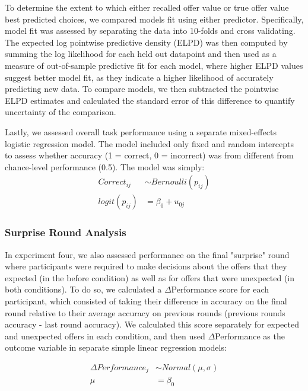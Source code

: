 \documentclass[10pt,letterpaper]{article}
\begin{document}
To determine the extent to which either recalled offer value or true offer value best predicted choices, we compared models fit using either predictor. Specifically, model fit was assessed by separating the data into 10-folds and cross validating. The expected log pointwise predictive density (ELPD) was then computed by summing the log likelihood for each held out datapoint and then used as a measure of out-of-sample predictive fit for each model, where higher ELPD values suggest better model fit, as they indicate a higher likelihood of accurately predicting new data. To compare models, we then subtracted the pointwise ELPD estimates and calculated the standard error of this difference to quantify uncertainty of the comparison\cite{vehtariPracticalBayesianModel2017, sivulaUncertaintyBayesianLeaveOneOut2023}.

Lastly, we assessed overall task performance using a separate mixed-effects logistic regression model. The model included only fixed and random intercepts to assess whether accuracy (1 = correct, 0 = incorrect) was from different from chance-level performance (0.5). The model was simply:
\begin{align*}
Correct_{ij} &\sim Bernoulli(p_{ij}) \\
logit(p_{ij}) &= \beta_0 + u_{0j}
\end{align*}

\subsubsection{Surprise Round Analysis}

In experiment four, we also assessed performance on the final "surprise" round where participants were required to make decisions about the offers that they expected (in the before condition) as well as for offers that were unexpected (in both conditions). To do so, we calculated a $\Delta$Performance score for each participant, which consisted of taking their difference in accuracy on the final round relative to their average accuracy on previous rounds (previous rounds accuracy - last round accuracy). We calculated this score separately for expected and unexpected offers in each condition, and then used $\Delta$Performance as the outcome variable in separate simple linear regression models:

\begin{align*}
\Delta Performance_{j} &\sim Normal(\mu, \sigma) \\
\mu &= \beta_0
\end{align*}
\end{document}
